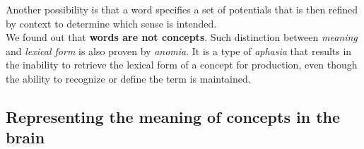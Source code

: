Another possibility is that a word specifies a set of potentials that is then refined by context to determine which sense is intended.\\

We found out that \textbf{words are not concepts}. Such distinction between \textit{meaning} and \textit{lexical form} is also proven by \textit{anomia}. It is a type of \textit{aphasia} that results in the inability to retrieve the lexical form of a concept for production, even though the ability to recognize or define the term is maintained.


\subsection{Representing the meaning of concepts in the brain}


